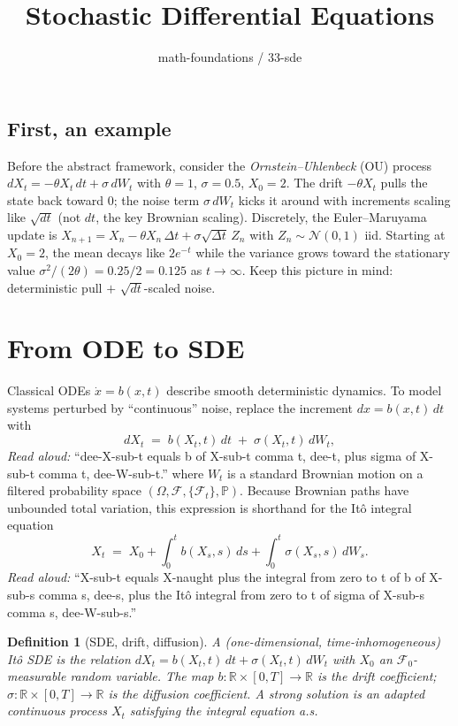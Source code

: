 \documentclass[11pt]{article}
\title{Stochastic Differential Equations}
\author{math-foundations / 33-sde}
\date{}
\newtheorem{definition}{Definition}
\begin{document}
\maketitle

\subsection*{First, an example}

Before the abstract framework, consider the \emph{Ornstein--Uhlenbeck} (OU) process
$dX_t = -\theta X_t\,dt + \sigma\,dW_t$ with $\theta = 1$, $\sigma = 0.5$, $X_0 = 2$.
The drift $-\theta X_t$ pulls the state back toward $0$; the noise term $\sigma\,dW_t$
kicks it around with increments scaling like $\sqrt{dt}$ (not $dt$, the key Brownian
scaling). Discretely, the Euler--Maruyama update is
$X_{n+1} = X_n - \theta X_n\,\Delta t + \sigma\sqrt{\Delta t}\,Z_n$ with
$Z_n \sim \mathcal{N}(0,1)$ iid. Starting at $X_0 = 2$, the mean decays like
$2 e^{-t}$ while the variance grows toward the stationary value
$\sigma^2/(2\theta) = 0.25/2 = 0.125$ as $t \to \infty$. Keep this picture in mind:
deterministic pull $+$ $\sqrt{dt}$-scaled noise.

\section{From ODE to SDE}

Classical ODEs $\dot x = b(x,t)$ describe smooth deterministic dynamics.
To model systems perturbed by ``continuous'' noise, replace the increment
$dx = b(x,t)\,dt$ with
\[
dX_t \;=\; b(X_t, t)\,dt \;+\; \sigma(X_t, t)\,dW_t,
\]
\emph{Read aloud:} ``dee-X-sub-t equals b of X-sub-t comma t, dee-t, plus sigma of X-sub-t comma t, dee-W-sub-t.''
where $W_t$ is a standard Brownian motion on a filtered probability space
$(\Omega, \mathcal{F}, \{\mathcal{F}_t\}, \mathbb{P})$. Because Brownian paths have
unbounded total variation, this expression is shorthand for the It\^o integral
equation
\[
X_t \;=\; X_0 + \int_0^t b(X_s,s)\,ds + \int_0^t \sigma(X_s,s)\,dW_s.
\]
\emph{Read aloud:} ``X-sub-t equals X-naught plus the integral from zero to t of b of X-sub-s comma s, dee-s, plus the It\^o integral from zero to t of sigma of X-sub-s comma s, dee-W-sub-s.''

\begin{definition}[SDE, drift, diffusion]
A (one-dimensional, time-inhomogeneous) \emph{It\^o SDE} is the relation
$dX_t = b(X_t,t)\,dt + \sigma(X_t,t)\,dW_t$ with $X_0$ an
$\mathcal{F}_0$-measurable random variable. The map $b:\mathbb{R}\times[0,T]\to\mathbb{R}$ is the
\emph{drift coefficient}; $\sigma:\mathbb{R}\times[0,T]\to\mathbb{R}$ is the \emph{diffusion
coefficient}. A \emph{strong solution} is an adapted continuous process $X_t$
satisfying the integral equation a.s.
\end{definition}
\end{document}

